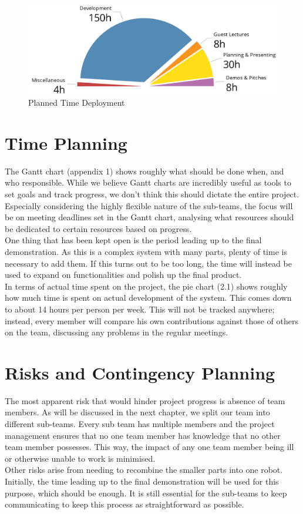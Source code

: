 \documentclass[a4paper,10pt,DIV10,openright,openbib]{scrreprt}
\begin{document}
\begin{figure}[h]
  \includegraphics[width=\textwidth]{pie.png}
  \caption{Planned Time Deployment}
\end{figure}

\section{Time Planning}
The Gantt chart (appendix 1) shows roughly what should be done when, and who responsible.
While we believe Gantt charts are incredibly useful as tools to set goals and track
progress, we don't think this should dictate the entire project. Especially considering
the highly flexible nature of the sub-teams, the focus will be on meeting deadlines set
in the Gantt chart, analysing what resources should be dedicated to certain
resources based on progress.\\
One thing that has been kept open is the period leading up to the final demonstration.
As this is a complex system with many parts, plenty of time is necessary to add them.
If this turns out to be too long, the time will instead be used to expand on functionalities
and polish up the final product.\\
In terms of  actual time spent on the project, the pie chart (2.1) shows roughly how
much time is spent on actual development of the system. This comes down to about
14 hours per person per week. This will not be tracked anywhere; instead, every member
will compare his own contributions against those of others on the team, discussing any
problems in the regular meetings.

\section{Risks and Contingency Planning}
The most apparent risk that would hinder project progress is absence of team members. 
As will be discussed in the next chapter, we split our team into different sub-teams. 
Every sub team has multiple members and the project management ensures that no 
one team member has knowledge that no other 
team member possesses. This way, the impact of any one team member being ill or 
otherwise unable to work is minimised.\\
Other risks arise from needing to recombine 
the smaller parts into one robot. Initially, the time leading up to the final demonstration
will be used for this purpose, which should be enough. It is still essential for the 
sub-teams to keep communicating to keep this process as straightforward as possible.
\end{document}
